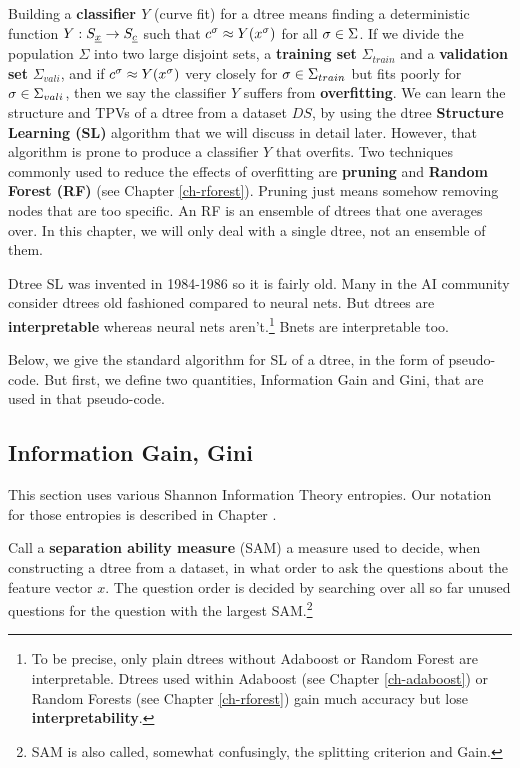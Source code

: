 Building a {\bf classifier $Y$} 
(curve fit) for a dtree means
finding a deterministic
function $Y:S_{\underline{x}}\rightarrow S_{\underline{c}}$ 
such that 
$c^\sigma \approx Y(x^\sigma)$
for all $\sigma\in \Sigma$.
If we divide
the population
$\Sigma$ 
into two large 
disjoint
sets, a {\bf training set} $\Sigma_{train}$
and a {\bf validation set} $\Sigma_{vali}$,
and if $c^\sigma \approx Y(x^\sigma)$ very closely
for $\sigma\in \Sigma_{train}$
but fits poorly
for $\sigma\in \Sigma_{vali}$,
then we say the classifier  $Y$
suffers from {\bf overfitting}.
We can learn the structure
and TPVs of a dtree from a dataset $DS$,
by using the
dtree {\bf Structure Learning (SL)}
algorithm that we will 
discuss in detail later. However,
that algorithm
is prone to produce
a classifier $Y$ that overfits.
Two techniques 
commonly used to 
reduce the effects of overfitting
are {\bf pruning}  and 
{\bf Random Forest (RF)}
(see Chapter \ref{ch-rforest}).
Pruning just means somehow
removing nodes that are
too specific. 
An RF is an ensemble of dtrees 
that one averages over.
In this chapter, we will only deal
with a single dtree,
not an ensemble of them. 

Dtree SL was invented in 1984-1986 so it
is fairly old.
Many in the AI
community 
consider dtrees old fashioned
compared to neural nets.
But dtrees 
are {\bf interpretable} whereas neural nets aren't.\footnote{
To be precise, only
plain dtrees without Adaboost or
 Random Forest
are interpretable.
Dtrees used within Adaboost 
(see Chapter
\ref{ch-adaboost}) or 
Random Forests (see Chapter
\ref{ch-rforest}) gain much
accuracy but lose
{\bf interpretability}.}
Bnets are interpretable too.


Below,
we give the standard
algorithm for SL
of a dtree, in the form
of pseudo-code.
But first,
we define
two quantities,
Information Gain and
Gini,
that are 
used in that 
pseudo-code.


\subsection{Information Gain, Gini}
This section uses various Shannon Information Theory
entropies. Our 
notation for those
entropies
is described in Chapter .


Call a {\bf separation ability measure} (SAM)
a measure used 
to decide, when 
constructing a dtree from a dataset,
in what order 
to ask the questions
about the feature vector $x$.
The question order is decided
by searching 
over all so far unused questions
for the question with 
the largest SAM.\footnote{SAM
is also called, somewhat
confusingly, the splitting
criterion and Gain.}



